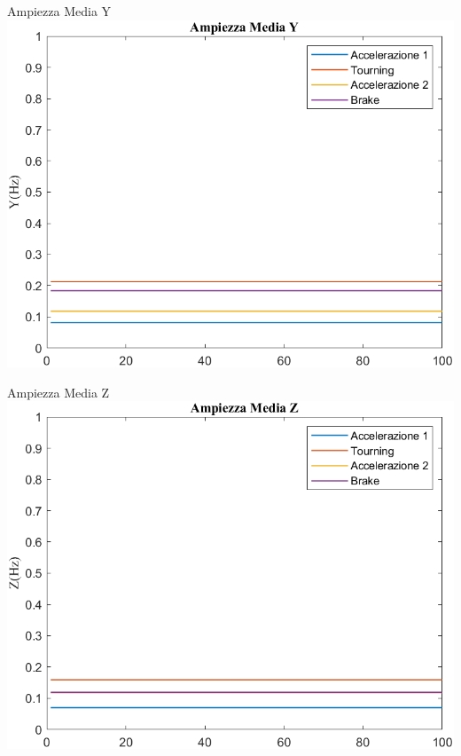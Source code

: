 \documentclass[beamer]{standalone}
\begin{document}
	\begin{frame}{{Ampiezza Media Y}}
		\centering\includegraphics[height=.8\textheight]{figure/Mag/Trasformata/Ampiezza MediaY}
	\end{frame}
	
	\begin{frame}{{Ampiezza Media Z}}
		\centering\includegraphics[height=.8\textheight]{figure/Mag/Trasformata/Ampiezza MediaZ}
	\end{frame}
	
\end{document}
